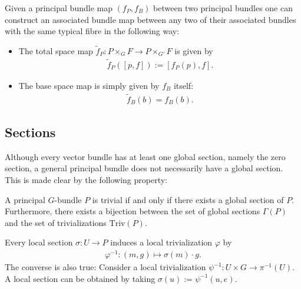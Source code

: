    \begin{construct}
        Given a principal bundle map $(f_P,f_B)$ between two principal bundles one can construct an associated bundle map between any two of their associated bundles with the same typical fibre in the following way:
        \begin{itemize}
            \item The total space map $\widetilde{f}_P:P\times_GF\rightarrow P\times_{G'}F$ is given by
                \begin{gather}
                    \widetilde{f}_P([p,f]) := [f_P(p),f].
                \end{gather}
            \item The base space map is simply given by $f_B$ itself:
                \begin{gather}
                    \widetilde{f}_B(b) = f_B(b).
                \end{gather}
        \end{itemize}
    \end{construct}

\subsection{Sections}

    Although every vector bundle has at least one global section, namely the zero section, a general principal bundle does not necessarily have a global section. This is made clear by the following property:
    \begin{property}
        A principal $G$-bundle $P$ is trivial if and only if there exists a global section of $P$. Furthermore, there exists a bijection between the set of global sections $\Gamma(P)$ and the set of trivializations $\text{Triv}(P)$.
    \end{property}
    \begin{result}\label{bundle:prin_section_triv}
        Every local section $\sigma:U\rightarrow P$ induces a local trivialization $\varphi$ by
        \begin{gather}
            \varphi^{-1}:(m,g)\mapsto\sigma(m)\cdot g.
        \end{gather}
        The converse is also true: Consider a local trivialization $\psi^{-1}:U\times G\rightarrow\pi^{-1}(U)$. A local section can be obtained by taking $\sigma(u):=\psi^{-1}(u,e)$.
    \end{result}


